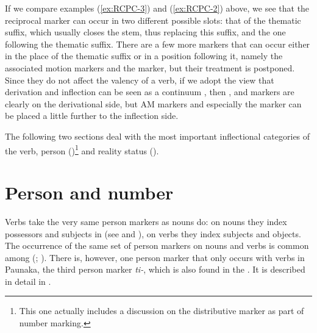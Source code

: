 If we compare examples (\ref{ex:RCPC-3}) and (\ref{ex:RCPC-2}) above, we see that the reciprocal marker can occur in two different possible slots: that of the thematic suffix, which usually closes the stem, thus replacing this suffix, and the one following the thematic suffix. There are a few more markers that can occur either in the place of the thematic suffix or in a position following it, namely the associated motion markers and the  marker, but their treatment is postponed. Since they do not affect the valency of a verb, if we adopt the view that derivation and inflection can be seen as a continuum \citep[cf.][261]{Croft2000}, then ,  and  markers are clearly on the derivational side, but AM markers and especially the  marker can be placed a little further to the inflection side.


The following two sections deal with the most important inflectional categories of the verb, person ()\footnote{This one actually includes a discussion on the distributive marker as part of number marking.} and reality status ().


%
%
%
%
%
%
%
%
%
%
%
%



\section{Person and number} \label{sec:NumberPersonVerbs}

Verbs take the very same person markers as nouns do: on nouns they index possessors and subjects in  (see  and ), on verbs they index subjects and objects. The occurrence of the same set of person markers on nouns and verbs is common among  (\citealp[cf.][89]{Aikhenvald1999}; \citealt[176]{Aikhenvald2012}). There is, however, one person marker that only occurs with verbs in Paunaka, the third person marker \textit{ti-}, which is also found in the . It is described in detail in .

